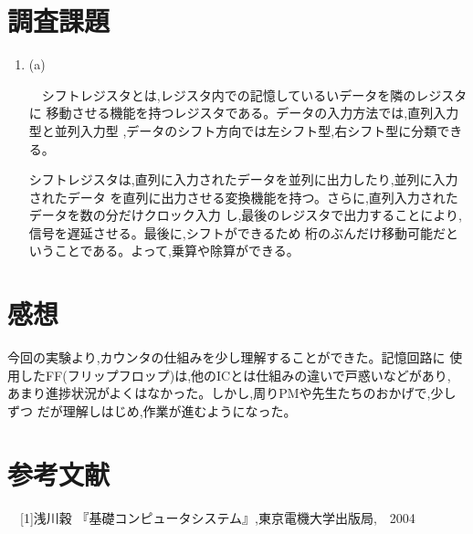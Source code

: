 \documentclass[a4paper,11pt,titlepage]{jarticle}
\begin{document}
\section{調査課題}
\begin{enumerate}
  \item (a)\par
  　シフトレジスタとは,レジスタ内での記憶しているいデータを隣のレジスタに
  移動させる機能を持つレジスタである。データの入力方法では,直列入力型と並列入力型
  ,データのシフト方向では左シフト型,右シフト型に分類できる。\par
    シフトレジスタは,直列に入力されたデータを並列に出力したり,並列に入力されたデータ
  を直列に出力させる変換機能を持つ。さらに,直列入力されたデータを数の分だけクロック入力
  し,最後のレジスタで出力することにより,信号を遅延させる。最後に,シフトができるため
  桁のぶんだけ移動可能だということである。よって,乗算や除算ができる。

\end{enumerate}

\section{感想}
  今回の実験より,カウンタの仕組みを少し理解することができた。記憶回路に
使用したFF(フリップフロップ)は,他のICとは仕組みの違いで戸惑いなどがあり,
あまり進捗状況がよくはなかった。しかし,周りPMや先生たちのおかげで,少しずつ
だが理解しはじめ,作業が進むようになった。
\section{参考文献}
\begin{thebibliography}{9}
　[1]浅川穀 『基礎コンピュータシステム』,東京電機大学出版局,　2004
\end{thebibliography}
\end{document}
